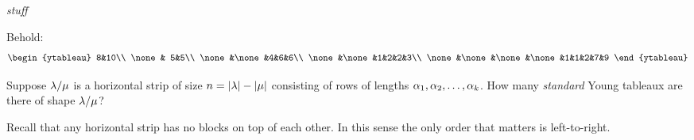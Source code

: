 \documentclass[12pt]{memoir}
\begin{document}
\begin{Ej}[Mandatory]
\emph{stuff}
\end{Ej}

\begin{ptcbr}
    Behold:
    $$
    \begin{ytableau}
        8&10\\
        \none & 5&5\\
        \none&\none&4&6&6\\
        \none&\none&1&2&2&3\\
        \none&\none&\none&\none&1&1&2&7&9
        \end{ytableau}
    $$
\end{ptcbr}

\begin{Ej}[Exercise 3]
   Suppose $\lambda/\mu$ is a horizontal strip of size $n=|\lambda|-|\mu|$ consisting of rows of lengths $\alpha_1,\alpha_2,\dots,\alpha_k$. How many \emph{standard} Young tableaux are there of shape $\lambda/\mu$? 
\end{Ej}

\begin{ptcbr}
   Recall that any horizontal strip has no blocks on top of each other. In this sense the only order that matters is left-to-right.
\end{ptcbr}
\end{document}

